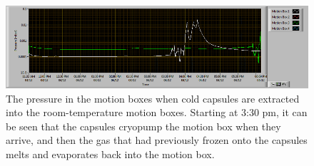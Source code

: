 \begin{figure}
    \centering
    \includegraphics[width=0.9\linewidth]{Figures/CUORE_vacuum_cryopumping.png}
    \caption[The pressure in the motion boxes when cold capsules are extracted into the room-temperature motion boxes]
    {The pressure in the motion boxes when cold capsules are extracted into the room-temperature motion boxes.
    Starting at 3:30 pm, it can be seen that the capsules cryopump the motion box when they arrive, and then the gas that had previously frozen onto the capsules melts and evaporates back into the motion box.}
    \label{fig:capsule_cryopumping}
\end{figure}

